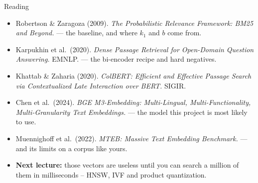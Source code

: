 \begin{frame}{Reading}
\begin{itemize}
  \item Robertson \& Zaragoza (2009). \textit{The Probabilistic Relevance Framework: BM25 and Beyond.} --- the baseline, and where $k_1$ and $b$ come from.
  \pause
  \item Karpukhin et al.\ (2020). \textit{Dense Passage Retrieval for Open-Domain Question Answering.} EMNLP. --- the bi-encoder recipe and hard negatives.
  \pause
  \item Khattab \& Zaharia (2020). \textit{ColBERT: Efficient and Effective Passage Search via Contextualized Late Interaction over BERT.} SIGIR.
  \pause
  \item Chen et al.\ (2024). \textit{BGE M3-Embedding: Multi-Lingual, Multi-Functionality, Multi-Granularity Text Embeddings.} --- the model this project is most likely to use.
  \pause
  \item Muennighoff et al.\ (2022). \textit{MTEB: Massive Text Embedding Benchmark.} --- and its limits on a corpus like yours.
  \pause
  \item \textbf{Next lecture:} those vectors are useless until you can search a million of them in milliseconds -- HNSW, IVF and product quantization.
\end{itemize}
\end{frame}
